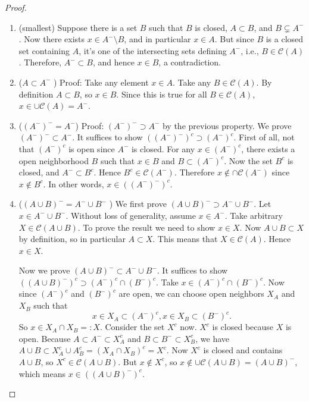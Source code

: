 \begin{enumerate}
\begin{proof}
	\begin{enumerate}
		\item (smallest) Suppose there is a set $B$ such that $B$ is closed, $A \subset B$, and $B \subsetneq A^-$. Now there exists $x \in A^- \setminus B$, and in particular $ x \in A$. But since $B$ is a closed set containing $A$, it's one of the intersecting sets defining $A^-$, i.e., $B \in \mathcal{C}(A)$. Therefore, $A^- \subset B$, and hence $x \in B$, a contradiction.
		\item ($A \subset A^-$ ) Proof:
			Take any element $x \in A$. Take any $B \in \mathcal{C}(A)$. By definition $A \subset B$, so $x \in B$. Since this is true for all $B \in \mathcal{C}(A)$, $x \in \cup \mathcal{C}(A) = A^-$.
		\item ($\left( A^- \right) ^- = A^-$) Proof:
			$\left( A^- \right) ^- \supset A^-$ by the previous property. We prove $\left( A^- \right) ^- \subset A^-$. 
			It suffices to show $\left( \left( A^- \right) ^- \right) ^c \supset \left( A^- \right) ^c$. First of all, not that $\left( A^- \right) ^c$ is open since $A^-$ is closed. 
			For any $x \in \left( A^- \right) ^c$, there exists a open neighborhood $B$ such that $x \in B$ and $B \subset \left( A^{-}\right)^c  $. Now the set  $B^c$ is closed, and $A^- \subset B^c$. Hence $B^c \in \mathcal{C}(A^-)$. 
			Therefore $x \not\in \cap \mathcal{C}(A^-)$ since $x \not\in B^c$. 
			In other words, $x \in \left( \left( A^- \right) ^- \right) ^c$.
		\item ($\left( A \cup B \right) ^- = A^- \cup B^-$ ) 
		We first prove $\left( A \cup B \right) ^- \supset A^- \cup B^-$. Let $x \in A^- \cup B^-$. Without loss of generality, assume $x \in A^-$. Take arbitrary $X \in \mathcal{C}(A \cup B)$. To prove the result we need to show $x \in X$. Now $A \cup B \subset X$ by definition, so in particular $A \subset X$. This means that $X \in \mathcal{C}(A)$. Hence $x \in X$.

		Now we prove $\left( A \cup B \right) ^- \subset A^- \cup B^-$. It suffices to show $\left( \left( A \cup B \right) ^- \right) ^c \supset \left( A^- \right) ^c \cap \left( B^- \right) ^c$. 
		Take $x \in \left( A^- \right) ^c \cap \left( B^- \right) ^c$.
		Now since $\left( A^- \right) ^c$ and $\left( B^- \right) ^c$ are open, we can choose open neighbors $X_A$ and $X_B$ such that \[
			x \in X_A \subset \left( A^- \right) ^c, x \in X_B \subset \left( B^- \right) ^c
		.\] 
		So $x \in X_A \cap X_B =: X$. Consider the set $X^c$ now. $X^c$ is closed because $X$ is open. Because $A \subset A^- \subset X_A^c$ and $B \subset B^- \subset X_B^c$, we have $A \cup B \subset X_A^c \cup A_B^c = (X_A \cap X_B)^c = X^c$. Now $X^c $ is closed and contains $A \cup B$, so $X^c \in \mathcal{C}(A \cup B)$. But $x \not\in X^c$, so $x \not\in \cup \mathcal{C}(A \cup B) = (A \cup B)^-$, which means $x \in \left( \left( A \cup B \right) ^- \right) ^c$.


\end{enumerate}
\end{proof}
\end{enumerate}
